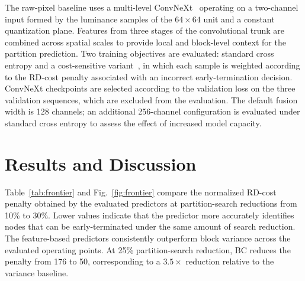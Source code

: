 \documentclass{article}
\begin{document}
The raw-pixel baseline uses a multi-level ConvNeXt~\cite{liu2022convnext} operating on a two-channel input formed by the luminance samples of the $64\times64$ unit and a constant quantization plane. Features from three stages of the convolutional trunk are combined across spatial scales to provide local and block-level context for the partition prediction. Two training objectives are evaluated: standard cross entropy and a cost-sensitive variant~\cite{elkan2001costsensitivelearning}, in which each sample is weighted according to the RD-cost penalty associated with an incorrect early-termination decision. ConvNeXt checkpoints are selected according to the validation loss on the three validation sequences, which are excluded from the evaluation. The default fusion width is 128 channels; an additional 256-channel configuration is evaluated under standard cross entropy to assess the effect of increased model capacity.



\section{Results and Discussion}

Table~\ref{tab:frontier} and Fig.~\ref{fig:frontier} compare the normalized RD-cost penalty obtained by the evaluated predictors at partition-search reductions from 10\% to 30\%. Lower values indicate that the predictor more accurately identifies nodes that can be early-terminated under the same amount of search reduction. The feature-based predictors consistently outperform block variance across the evaluated operating points. At 25\% partition-search reduction, BC reduces the penalty from 176 to 50, corresponding to a $3.5\times$ reduction relative to the variance baseline.
\end{document}
